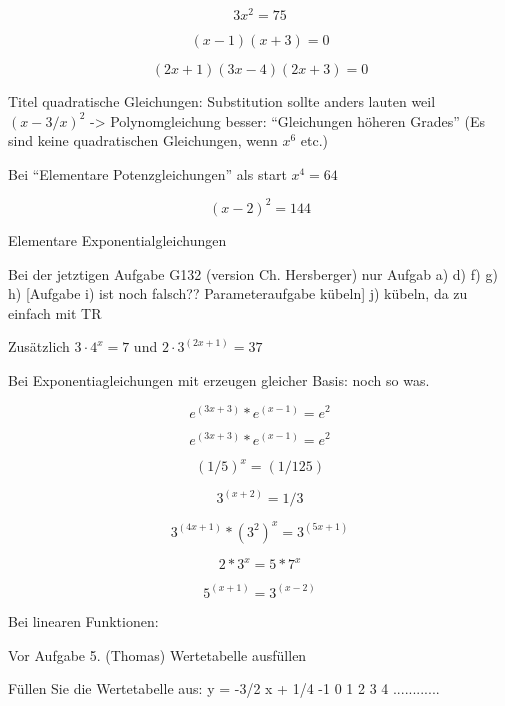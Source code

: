 $$3x^2=75$$

$$\left(x-1\right)\left(x+3\right)=0 $$

$$\left(2x+1\right)\left(3x-4\right)\left(2x+3\right)=0 $$

Titel quadratische Gleichungen: Substitution sollte anders lauten
weil $(x-3/x)^2$ -> Polynomgleichung besser: ``Gleichungen höheren
Grades'' (Es sind keine quadratischen Gleichungen, wenn $x^6$ etc.)

Bei ``Elementare Potenzgleichungen'' als start $x^4 = 64$

$$(x-2)^2 = 144$$


Elementare Exponentialgleichungen 

Bei der jetztigen Aufgabe G132 (version Ch. Hersberger) nur Aufgab
a) d) f) g) h)    [Aufgabe i) ist noch falsch?? Parameteraufgabe kübeln]
j) kübeln, da zu einfach mit TR

Zusätzlich $3\cdot{} 4^x = 7$
und $2\cdot{}3^(2x+1)=37 $

Bei Exponentiagleichungen mit erzeugen gleicher Basis:
noch so was.

$$e^(3x+3)*e^(x-1)=e^2 $$

$$e^(3x+3)*e^(x-1)=e^2$$


$$(1/5)^x = (1/125)$$

$$3^(x+2)=1/3$$
 
$$3^(4x+1)*(3^2)^x=3^(5x+1) $$

$$2*3^x = 5*7^x$$

$$5^(x+1)=3^(x-2) $$



Bei linearen Funktionen:

Vor Aufgabe 5. (Thomas)
Wertetabelle ausfüllen

Füllen Sie die Wertetabelle aus:    y = -3/2 x + 1/4
-1 0 1 2 3 4
............


